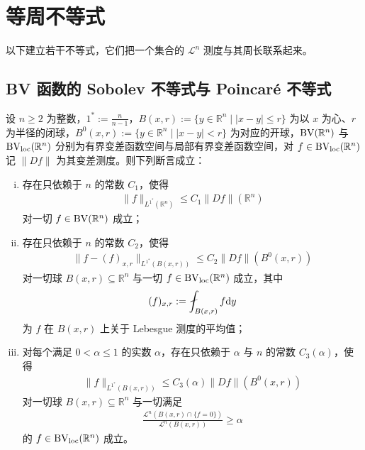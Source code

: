 ﻿\documentclass[../../main.tex]{subfiles}%
\begin{document}
\section{等周不等式}\label{section:ch05-06}

以下建立若干不等式，它们把一个集合的 $\mathcal{L}^n$ 测度与其周长联系起来。

\subsection{BV 函数的 Sobolev 不等式与 Poincaré 不等式}\label{subsection:ch05-06-1}

\begin{theorem}[$\BV$ 函数的不等式]\label{theorem:ch05-5-10}
设 $n\geqslant2$ 为整数，$1^*:=\frac{n}{n-1}$，$B(x,r):=\{y\in\mathbb{R}^n\mid\lvert x-y\rvert\leqslant r\}$ 为以 $x$ 为心、$r$ 为半径的闭球，$B^0(x,r):=\{y\in\mathbb{R}^n\mid\lvert x-y\rvert<r\}$ 为对应的开球，$\mathrm{BV}(\mathbb{R}^n)$ 与 $\mathrm{BV}_{\mathrm{loc}}(\mathbb{R}^n)$ 分别为有界变差函数空间与局部有界变差函数空间，对 $f\in\mathrm{BV}_{\mathrm{loc}}(\mathbb{R}^n)$ 记 $\lVert Df\rVert$ 为其变差测度。则下列断言成立：
\begin{enumerate}[(i)]
\item 存在只依赖于 $n$ 的常数 $C_1$，使得
\begin{align*}
\lVert f\rVert_{L^{1^*}(\mathbb{R}^n)}\leqslant C_1\lVert Df\rVert(\mathbb{R}^n)
\end{align*}
对一切 $f\in\mathrm{BV}(\mathbb{R}^n)$ 成立；
\item 存在只依赖于 $n$ 的常数 $C_2$，使得
\begin{align*}
\lVert f-(f)_{x,r}\rVert_{L^{1^*}(B(x,r))}\leqslant C_2\lVert Df\rVert(B^0(x,r))
\end{align*}
对一切球 $B(x,r)\subseteq\mathbb{R}^n$ 与一切 $f\in\mathrm{BV}_{\mathrm{loc}}(\mathbb{R}^n)$ 成立，其中
\begin{align*}
(f)_{x,r}:=\fint_{B(x,r)}f\diff y
\end{align*}
为 $f$ 在 $B(x,r)$ 上关于 Lebesgue 测度的平均值；
\item 对每个满足 $0<\alpha\leqslant1$ 的实数 $\alpha$，存在只依赖于 $\alpha$ 与 $n$ 的常数 $C_3(\alpha)$，使得
\begin{align*}
\lVert f\rVert_{L^{1^*}(B(x,r))}\leqslant C_3(\alpha)\lVert Df\rVert(B^0(x,r))
\end{align*}
对一切球 $B(x,r)\subseteq\mathbb{R}^n$ 与一切满足
\begin{align*}
\frac{\mathcal{L}^n(B(x,r)\cap\{f=0\})}{\mathcal{L}^n(B(x,r))}\geqslant\alpha
\end{align*}
的 $f\in\mathrm{BV}_{\mathrm{loc}}(\mathbb{R}^n)$ 成立。
\end{enumerate}
\end{theorem}
\end{document}
